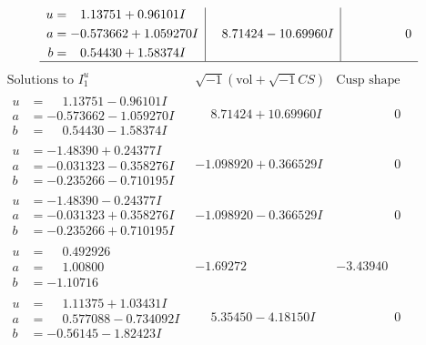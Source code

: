 \documentclass[1p]{elsarticle_modified}
\theoremstyle{definition}
\newcommand{\I}{\sqrt{-1}}
\begin{document}
$$\begin{array}{c|c|c}
\begin{aligned}
u &= \phantom{-}1.13751 + 0.96101 I \\
a &= -0.573662 + 1.059270 I \\
b &= \phantom{-}0.54430 + 1.58374 I\end{aligned}
 & \phantom{-}8.71424 - 10.69960 I & \phantom{-0.000000 } 0\\
 \hline 
 \end{array}$$\newpage$$\begin{array}{c|c|c}  
\text{Solutions to }I^u_{1}& \I (\text{vol} + \sqrt{-1}CS) & \text{Cusp shape}\\
 \hline 
\begin{aligned}
u &= \phantom{-}1.13751 - 0.96101 I \\
a &= -0.573662 - 1.059270 I \\
b &= \phantom{-}0.54430 - 1.58374 I\end{aligned}
 & \phantom{-}8.71424 + 10.69960 I & \phantom{-0.000000 } 0 \\ \hline\begin{aligned}
u &= -1.48390 + 0.24377 I \\
a &= -0.031323 - 0.358276 I \\
b &= -0.235266 - 0.710195 I\end{aligned}
 & -1.098920 + 0.366529 I & \phantom{-0.000000 } 0 \\ \hline\begin{aligned}
u &= -1.48390 - 0.24377 I \\
a &= -0.031323 + 0.358276 I \\
b &= -0.235266 + 0.710195 I\end{aligned}
 & -1.098920 - 0.366529 I & \phantom{-0.000000 } 0 \\ \hline\begin{aligned}
u &= \phantom{-}0.492926\phantom{ +0.000000I} \\
a &= \phantom{-}1.00800\phantom{ +0.000000I} \\
b &= -1.10716\phantom{ +0.000000I}\end{aligned}
 & -1.69272\phantom{ +0.000000I} & -3.43940\phantom{ +0.000000I} \\ \hline\begin{aligned}
u &= \phantom{-}1.11375 + 1.03431 I \\
a &= \phantom{-}0.577088 - 0.734092 I \\
b &= -0.56145 - 1.82423 I\end{aligned}
 & \phantom{-}5.35450 - 4.18150 I & \phantom{-0.000000 } 0 \\ \hline\begin{aligned}

\end{aligned}
\end{array}$$
\end{document}
